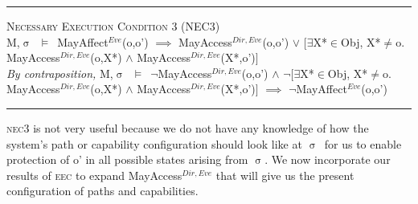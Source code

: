 \documentclass[a4paper,11pt, twoside,twocolumn]{article}
\newenvironment{logic}[1][null]
{\begin{flushleft} \small \label{#1}}
{\end{flushleft}}
\newcommand{\loin}{$\in$}
\newcommand{\loexists}{$\exists$}
\newcommand{\loand}{$\land$}
\newcommand{\loor} {$\lor$}
\newcommand{\loneq} {$\neq$}
\newcommand{\loimplies}{$\implies$}
\newcommand{\losigma}{$\upsigma$}
\newcommand{\loturns} {$\vDash$}
\newcommand{\loneg}{$\boldsymbol \neg$}
\newcommand{\ablock} {\null\qquad}
\begin{document}
\begin{logic}
\hrule\null
\textsc{\normalsize *Necessary Execution Condition 3 (NEC3)}\\
M,\losigma\ \loturns\ MayAffect$^{Eve}$(o,o')\linebreak
	\ablock \loimplies\linebreak
	\ablock MayAccess$^{Dir,Eve}$(o,o') \loor \linebreak
	\ablock $[$\loexists X*\loin Obj, X*\loneq o. MayAccess$^{Dir,Eve}$(o,X*) \loand\linebreak
	\ablock \ablock MayAccess$^{Dir,Eve}$(X*,o')$]$
	\linebreak\\
\textit{By contraposition,}\linebreak
M,\losigma\ \loturns\ \loneg MayAccess$^{Dir,Eve}$(o,o') \loand \linebreak
	\ablock \loneg$[$\loexists X*\loin Obj, X*\loneq o. MayAccess$^{Dir,Eve}$(o,X*) \loand\linebreak
	\ablock \ablock MayAccess$^{Dir,Eve}$(X*,o')$]$\linebreak
	\ablock \loimplies\linebreak
	\ablock \loneg MayAffect$^{Eve}$(o,o')
	\linebreak
\hrule
\end{logic}
\textsc{nec3} is not very useful because we do not have any knowledge of how the system's path or capability configuration should look like at \losigma\ for us to enable protection of o' in all possible states arising from \losigma. We now incorporate our results of \textsc{eec} to expand MayAccess$^{Dir,Eve}$ that will give us the present configuration of paths and capabilities.\\
\end{document}
